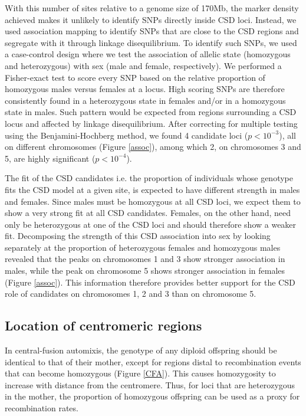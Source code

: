 \documentclass[11pt,a4paper]{report}
\begin{document}
With this number of sites relative to a genome size of 170Mb, the marker density achieved makes it unlikely to identify SNPs directly inside CSD loci. Instead, we used association mapping to identify SNPs that are close to the CSD regions and segregate with it through linkage disequilibrium. To identify such SNPs, we used a case-control design where we test the association of allelic state (homozygous and heterozygous) with sex (male and female, respectively). We performed a Fisher-exact test to score every SNP based on the relative proportion of homozygous males versus females at a locus. High scoring SNPs are therefore consistently found in a heterozygous state in females and/or in a homozygous state in males. Such pattern would be expected from regions surrounding a CSD locus and affected by linkage disequilibrium. After correcting for multiple testing using the Benjamini-Hochberg method, we found 4 candidate loci ($p<10^{-3}$), all on different chromosomes (Figure \ref{assoc}), among which 2, on chromosomes 3 and 5, are highly significant ($p<10^{-4}$). 

The fit of the CSD candidates i.e. the proportion of individuals whose genotype fits the CSD model at a given site, is expected to have different strength in males and females. Since males must be homozygous at all CSD loci, we expect them to show a very strong fit at all CSD candidates. Females, on the other hand, need only be heterozygous at one of the CSD loci and should therefore show a weaker fit. Decomposing the strength of this CSD association into sex by looking separately at the proportion of heterozygous females and homozygous males revealed that the peaks on chromosomes 1 and 3 show stronger association in males, while the peak on chromosome 5 shows stronger association in females (Figure \ref{assoc}). This information therefore provides better support for the CSD role of candidates on chromosomes 1, 2 and 3 than on chromosome 5.

\subsection{Location of centromeric regions}
In central-fusion automixis, the genotype of any diploid offspring should be identical to that of their mother, except for regions distal to recombination events that can become homozygous (Figure \ref{CFA}). This causes homozygosity to increase with distance from the centromere. Thus, for loci that are heterozygous in the mother, the proportion of homozygous offspring can be used as a proxy for recombination rates. 
\end{document}
